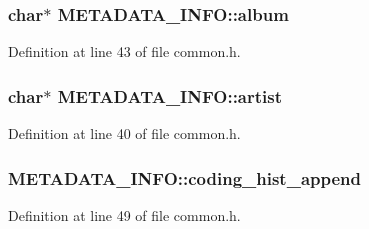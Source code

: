 \subsubsection[{\texorpdfstring{album}{album}}]{ char$\ast$ M\+E\+T\+A\+D\+A\+T\+A\+\_\+\+I\+N\+F\+O\+::album}\hypertarget{struct_m_e_t_a_d_a_t_a___i_n_f_o_ae299618fdefe0c6e1b8851953927864a}{}\label{struct_m_e_t_a_d_a_t_a___i_n_f_o_ae299618fdefe0c6e1b8851953927864a}


Definition at line 43 of file common.\+h.

\subsubsection[{\texorpdfstring{artist}{artist}}]{ char$\ast$ M\+E\+T\+A\+D\+A\+T\+A\+\_\+\+I\+N\+F\+O\+::artist}\hypertarget{struct_m_e_t_a_d_a_t_a___i_n_f_o_a4aa62249d609ad2776d95618484ff2f4}{}\label{struct_m_e_t_a_d_a_t_a___i_n_f_o_a4aa62249d609ad2776d95618484ff2f4}


Definition at line 40 of file common.\+h.

\subsubsection[{\texorpdfstring{coding\+\_\+hist\+\_\+append}{coding_hist_append}}]{ M\+E\+T\+A\+D\+A\+T\+A\+\_\+\+I\+N\+F\+O\+::coding\+\_\+hist\+\_\+append}\hypertarget{struct_m_e_t_a_d_a_t_a___i_n_f_o_a4cf4ebeb9c0c475499417afa5cd379fd}{}\label{struct_m_e_t_a_d_a_t_a___i_n_f_o_a4cf4ebeb9c0c475499417afa5cd379fd}


Definition at line 49 of file common.\+h.

